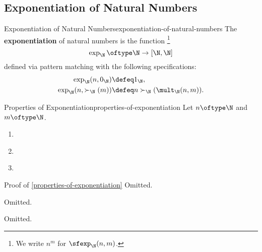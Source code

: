 \subsection{Exponentiation of Natural Numbers}\label{subsection-martin-löf-type-theory-exponentiation-of-natural-numbers}
\begin{definition}{Exponentiation of Natural Numbers}{exponentiation-of-natural-numbers}%
    The \textbf{exponentiation} of natural numbers is the function%
    \footnote{%
        We write $n^{m}$ for $\sfexp_{\N}(n,m)$.
        \par\vspace*{\TCBBoxCorrection}
    }%
    \[
        \exp_{\N}%
        \oftype%
        \N%
        \to%
        [\N,\N]%
    \]%
    defined via pattern matching with the following specifications:%
    \begin{align*}
        \exp_{\N}(n,0_{\N})        &\defeq 1_{\N},\\
        \exp_{\N}(n,\succ_{\N}(m)) &\defeq n\succ_{\N}(\mult_{\N}(n,m)).%
    \end{align*}
\end{definition}
\begin{proposition}{Properties of Exponentiation}{properties-of-exponentiation}%
    Let $n\oftype\N$ and $m\oftype\N$.
    \begin{enumerate}
        \item\label{properties-of-exponentiation-unitality}
        \item\label{properties-of-exponentiation-associativity}
        \item\label{properties-of-exponentiation-commutativity}
    \end{enumerate}
\end{proposition}
\begin{Proof}{Proof of \cref{properties-of-exponentiation}}%
    Omitted.

    Omitted.

    Omitted.
\end{Proof}
